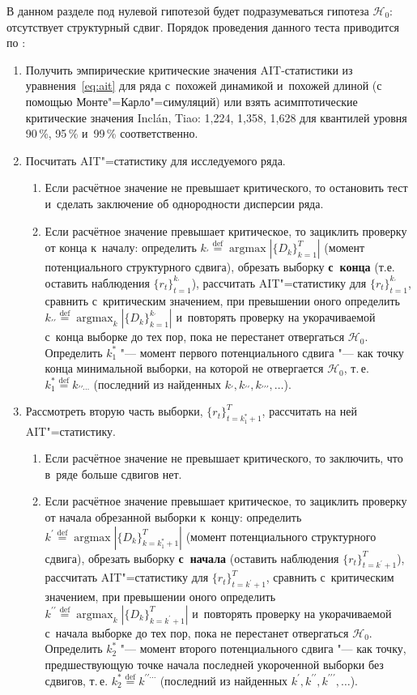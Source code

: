 \documentclass[11pt]{article}
\DeclareMathOperator*{\argmax}{argmax}
\newcommand{\hypo}{\mathcal{H}}
\newcommand{\eqdef}{\mathrel{\stackrel{\text{def}}=}} %
\begin{document}
В данном разделе под нулевой гипотезой будет подразумеваться гипотеза $\hypo_0\colon$ отсутствует структурный сдвиг. Порядок проведения данного теста приводится по \citet{inclan1994use}:
\begin{enumerate}
	\item\label{item:one} Получить эмпирические критические значения AIT-статистики из уравнения~\eqref{eq:ait} для ряда с~похожей динамикой и~похожей длиной (с помощью Монте"=Карло"=симуляций) или взять асимптотические критические значения Inclán, Tiao: 1{,}224, 1{,}358, 1{,}628\label{page:critval} для квантилей уровня 90\,\%, 95\,\% и~99\,\% соответственно.
	\item\label{item:two} Посчитать AIT"=статистику для исследуемого ряда.
	\begin{enumerate}
		\item  Если расчётное значение не превышает критического, то остановить тест и~сделать заключение об однородности дисперсии ряда.
		\item\label{item:begin} Если расчётное значение превышает критическое, то зациклить проверку от конца к~началу: определить $k_{\prime} \eqdef \argmax |\{D_k\}_{k=1}^T|$ (момент потенциального структурного сдвига), обрезать выборку \textbf{с~конца} (т.е. оставить наблюдения $\{r_t\}_{t=1}^{k_{\prime}}$), рассчитать AIT"=статистику для $\{r_t\}_{t=1}^{k_{\prime}}$, сравнить с~критическим значением, при превышении оного определить $k_{\prime\prime}\eqdef \argmax_k |\{D_k\}_{k=1}^{k_\prime}|$ и~повторять проверку на укорачиваемой с~конца выборке до тех пор, пока не перестанет отвергаться $\hypo_0$. Определить $k^*_1$ "--- момент первого потенциального сдвига "--- как точку конца минимальной выборки, на которой не отвергается $\hypo_0$, т.\,е. $k_1^* \eqdef k_{\prime\prime\cdots}$ (последний из найденных $k_{\prime}, k_{\prime\prime}, k_{\prime\prime\prime}, \ldots$).
	\end{enumerate}
	\item\label{item:three} Рассмотреть вторую часть выборки, $\{r_t\}_{t=k^*_1+1}^{T}$, рассчитать на ней AIT"=статистику.
	\begin{enumerate}
		\item Если расчётное значение не превышает критического, то заключить, что в~ряде больше сдвигов нет.
		\item\label{item:end} Если расчётное значение превышает критическое, то зациклить проверку от начала обрезанной выборки к~концу: определить $k^{\prime} \eqdef \argmax \allowbreak |\{D_k\}_{k=k^*_1+1}^T|$ (момент потенциального структурного сдвига), обрезать выборку \textbf{с~начала} (оставить наблюдения $\{r_t\}_{t=k^\prime+1}^{T}$), рассчитать AIT"=статистику для $\{r_t\}_{t=k^\prime+1}^{T}$, сравнить с~критическим значением, при превышении оного определить $k^{\prime\prime}\eqdef \argmax_k |\{D_k\}_{k=k^\prime+1}^{T}|$ и~повторять проверку на укорачиваемой с~начала выборке до тех пор, пока не перестанет отвергаться $\hypo_0$. Определить $k^*_2$ "--- момент второго потенциального сдвига "--- как точку, предшествующую точке начала последней укороченной выборки без сдвигов, т.\,е. $k^*_2 \eqdef k^{\prime\prime\cdots}$ (последний из найденных $k^{\prime}, k^{\prime\prime}, k^{\prime\prime\prime}, \ldots$).

\end{enumerate}
\end{enumerate}
\end{document}
